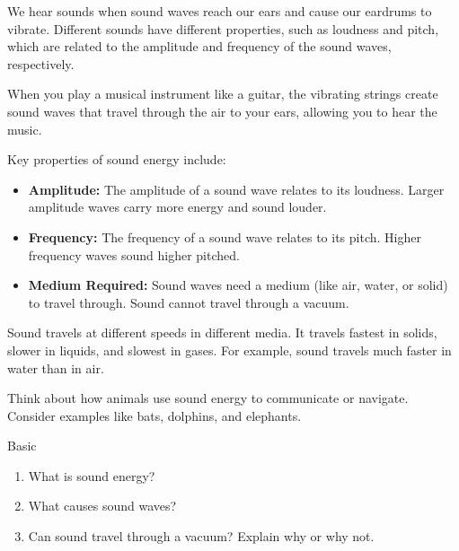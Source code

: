 
We hear sounds when sound waves reach our ears and cause our eardrums to vibrate.  Different sounds have different properties, such as loudness and pitch, which are related to the amplitude and frequency of the sound waves, respectively.

\begin{example}
When you play a musical instrument like a guitar, the vibrating strings create sound waves that travel through the air to your ears, allowing you to hear the music.
\end{example}

Key properties of sound energy include:

\begin{itemize}
    \item \textbf{Amplitude:}  The amplitude of a sound wave relates to its loudness.  Larger amplitude waves carry more energy and sound louder.
    \item \textbf{Frequency:} The frequency of a sound wave relates to its pitch.  Higher frequency waves sound higher pitched.
    \item \textbf{Medium Required:} Sound waves need a medium (like air, water, or solid) to travel through. Sound cannot travel through a vacuum.
\end{itemize}

\begin{marginnote}
Sound travels at different speeds in different media.  It travels fastest in solids, slower in liquids, and slowest in gases.  For example, sound travels much faster in water than in air.
\end{marginnote}

\begin{stopandthink}
Think about how animals use sound energy to communicate or navigate. Consider examples like bats, dolphins, and elephants.
\end{stopandthink}


\begin{tieredquestions}{Basic}
\begin{enumerate}
    \item What is sound energy?
    \item What causes sound waves?
    \item Can sound travel through a vacuum? Explain why or why not.
\end{enumerate}
\end{tieredquestions}

